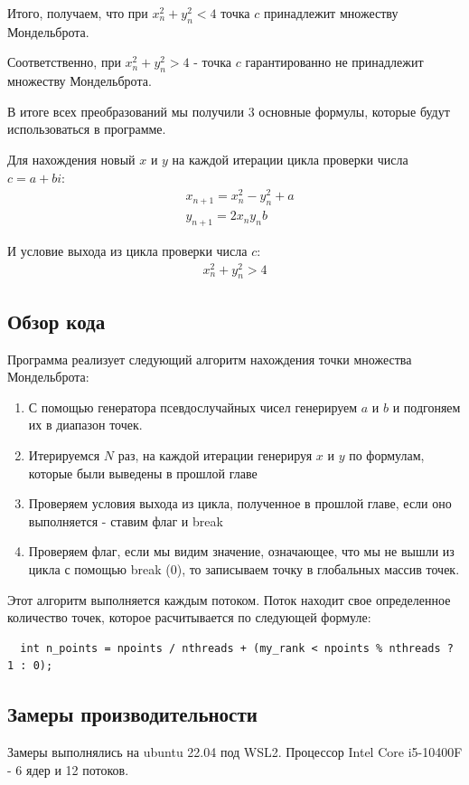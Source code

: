 \documentclass[12pt,a4paper]{article}
\begin{document}
Итого, получаем, что при $x_n^2 + y_n^2 < 4$ точка $c$ принадлежит множеству Мондельброта.

Соответственно, при $x_n^2 + y_n^2 > 4$ - точка $c$ гарантированно не принадлежит множеству Мондельброта.


В итоге всех преобразований мы получили 3 основные формулы, которые будут использоваться в программе.

Для нахождения новый $x$ и $y$ на каждой итерации цикла проверки числа $c = a + bi$:
\begin{align}
  &x_{n+1} = x_n^2 - y_n^2 + a \\
  &y_{n+1} = 2x_ny_nb
\end{align}

И условие выхода из цикла проверки числа $c$:
\begin{align}
  x_n^2 + y_n^2 > 4
\end{align}
\subsection{Обзор кода}
Программа реализует следующий алгоритм нахождения точки множества Мондельброта:
\begin{enumerate}
\item С помощью генератора псевдослучайных чисел генерируем $a$ и $b$ и подгоняем их в диапазон точек.
\item Итерируемся $N$ раз, на каждой итерации генерируя $x$ и $y$ по формулам, которые были выведены в прошлой главе
\item Проверяем условия выхода из цикла, полученное в прошлой главе, если оно выполняется - ставим флаг и break
\item Проверяем флаг, если мы видим значение, означающее, что мы не вышли из цикла с помощью break (0), то записываем точку в глобальных массив точек.
\end{enumerate}

Этот алгоритм выполняется каждым потоком. Поток находит свое определенное количество точек, которое расчитывается по следующей формуле:

\begin{verbatim}
  int n_points = npoints / nthreads + (my_rank < npoints % nthreads ? 1 : 0);
\end{verbatim}

\subsection{Замеры производительности}
Замеры выполнялись на ubuntu 22.04 под WSL2. Процессор Intel Core i5-10400F - 6 ядер и 12 потоков.
\end{document}
